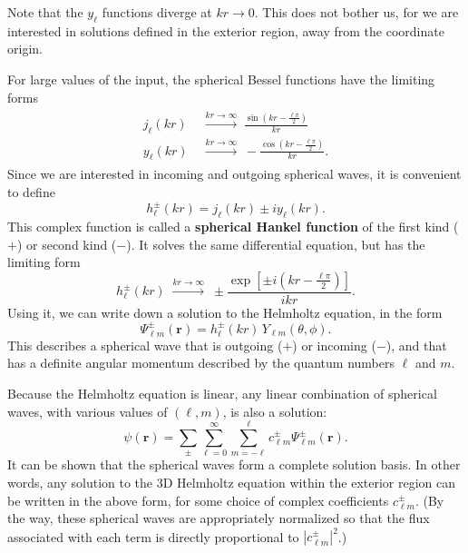 \documentclass[pra,12pt]{revtex4}
\begin{document}
Note that the $y_\ell$ functions diverge at $kr\rightarrow 0$.  This
does not bother us, for we are interested in solutions defined in the
exterior region, away from the coordinate origin.

For large values of the input, the spherical Bessel functions have the
limiting forms
\begin{align}
  \begin{aligned}j_\ell(kr)\; &\overset{kr\rightarrow\infty}{\longrightarrow} \; \frac{\sin(kr-\frac{\ell\pi}{2})}{kr} \\ y_\ell(kr)\; &\overset{kr\rightarrow\infty}{\longrightarrow} \; - \frac{\cos(kr-\frac{\ell\pi}{2})}{kr}.\end{aligned}
\end{align}
Since we are interested in incoming and outgoing spherical waves, it
is convenient to define
\begin{equation}
  h_\ell^\pm(kr) = j_\ell(kr) \pm i y_\ell(kr).
\end{equation}
This complex function is called a \textbf{spherical Hankel function}
of the first kind ($+$) or second kind ($-$).  It solves the same
differential equation, but has the limiting form
\begin{equation}
  h_\ell^\pm(kr)\; \overset{kr\rightarrow\infty}{\longrightarrow} \; \pm \frac{\exp\left[\pm i(kr-\frac{\ell\pi}{2})\right]}{ikr}.
\end{equation}
Using it, we can write down a solution to the Helmholtz equation, in
the form
\begin{equation}
  \Psi_{\ell m}^\pm(\mathbf{r}) = h_{\ell}^\pm(kr) \,Y_{\ell m}(\theta,\phi).
\end{equation}
This describes a spherical wave that is outgoing ($+$) or incoming
($-$), and that has a definite angular momentum described by the
quantum numbers $\ell$ and $m$.

Because the Helmholtz equation is linear, any linear combination of
spherical waves, with various values of $(\ell,m)$, is also a solution:
\begin{equation}
  \psi(\mathbf{r}) = \sum_\pm \sum_{\ell = 0}^\infty \sum_{m = - \ell}^\ell c_{\ell m}^\pm \Psi_{\ell m}^\pm(\mathbf{r}).
\end{equation}
It can be shown that the spherical waves form a complete solution
basis.  In other words, any solution to the 3D Helmholtz equation
within the exterior region can be written in the above form, for some
choice of complex coefficients $c_{\ell m}^\pm$.  (By the way, these
spherical waves are appropriately normalized so that the flux
associated with each term is directly proportional to $|c_{\ell
  m}^\pm|^2$.)
\end{document}
